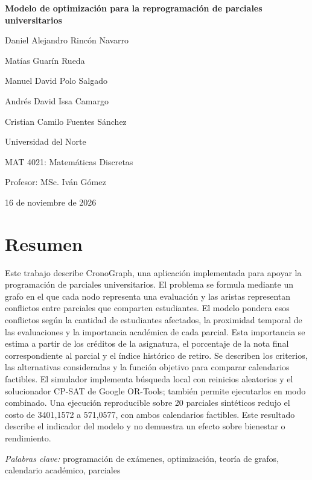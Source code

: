 \documentclass[12pt,letterpaper]{article}
\begin{document}
\begin{titlepage}
\thispagestyle{fancy}
\centering
\vspace*{0.65in}
{\bfseries Modelo de optimización para la reprogramación de parciales universitarios\par}
\vspace{\baselineskip}
Daniel Alejandro Rincón Navarro\par
Matías Guarín Rueda\par
Manuel David Polo Salgado\par
Andrés David Issa Camargo\par
Cristian Camilo Fuentes Sánchez\par

\vspace{0.5\baselineskip}
Universidad del Norte\par
MAT 4021: Matemáticas Discretas\par
Profesor: MSc. Iván Gómez\par
16 de noviembre de 2026\par
\end{titlepage}
\setcounter{page}{2}
\section*{Resumen}
\noindent Este trabajo describe CronoGraph, una aplicación implementada para apoyar la programación de parciales universitarios. El problema se formula mediante un grafo en el que cada nodo representa una evaluación y las aristas representan conflictos entre parciales que comparten estudiantes. El modelo pondera esos conflictos según la cantidad de estudiantes afectados, la proximidad temporal de las evaluaciones y la importancia académica de cada parcial. Esta importancia se estima a partir de los créditos de la asignatura, el porcentaje de la nota final correspondiente al parcial y el índice histórico de retiro. Se describen los criterios, las alternativas consideradas y la función objetivo para comparar calendarios factibles. El simulador implementa búsqueda local con reinicios aleatorios y el solucionador CP-SAT de Google OR-Tools; también permite ejecutarlos en modo combinado. Una ejecución reproducible sobre 20 parciales sintéticos redujo el costo de 3401,1572 a 571,0577, con ambos calendarios factibles. Este resultado describe el indicador del modelo y no demuestra un efecto sobre bienestar o rendimiento.


\noindent\textit{Palabras clave:} 
programación de exámenes, optimización, teoría de grafos, calendario académico, parciales
\end{document}
